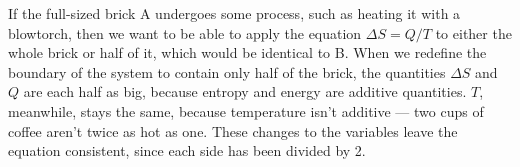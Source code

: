 If the full-sized brick A undergoes some process, such as heating it with a blowtorch,
then we want to be able to apply the equation $\Delta S=Q/T$
to either the whole brick or half of it, which would be identical to B.
When we redefine the boundary of the system to contain only half of the brick,
the quantities $\Delta S$ and $Q$ are each half as big, because entropy and energy are
additive quantities. $T$, meanwhile, stays the
same, because temperature isn't additive --- two cups of coffee aren't twice as hot as one.
These changes to the variables leave the equation consistent, since each side has been divided by 2.
